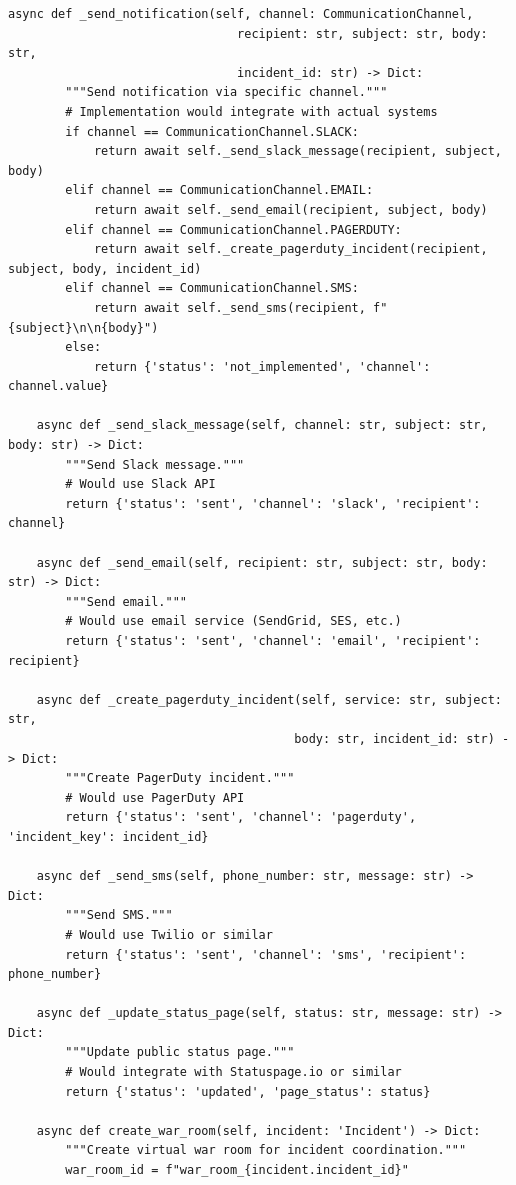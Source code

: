 \begin{lstlisting}[style=python, caption={Incident communication with multi-channel notifications}]
    async def _send_notification(self, channel: CommunicationChannel,
                                recipient: str, subject: str, body: str,
                                incident_id: str) -> Dict:
        """Send notification via specific channel."""
        # Implementation would integrate with actual systems
        if channel == CommunicationChannel.SLACK:
            return await self._send_slack_message(recipient, subject, body)
        elif channel == CommunicationChannel.EMAIL:
            return await self._send_email(recipient, subject, body)
        elif channel == CommunicationChannel.PAGERDUTY:
            return await self._create_pagerduty_incident(recipient, subject, body, incident_id)
        elif channel == CommunicationChannel.SMS:
            return await self._send_sms(recipient, f"{subject}\n\n{body}")
        else:
            return {'status': 'not_implemented', 'channel': channel.value}

    async def _send_slack_message(self, channel: str, subject: str, body: str) -> Dict:
        """Send Slack message."""
        # Would use Slack API
        return {'status': 'sent', 'channel': 'slack', 'recipient': channel}

    async def _send_email(self, recipient: str, subject: str, body: str) -> Dict:
        """Send email."""
        # Would use email service (SendGrid, SES, etc.)
        return {'status': 'sent', 'channel': 'email', 'recipient': recipient}

    async def _create_pagerduty_incident(self, service: str, subject: str,
                                        body: str, incident_id: str) -> Dict:
        """Create PagerDuty incident."""
        # Would use PagerDuty API
        return {'status': 'sent', 'channel': 'pagerduty', 'incident_key': incident_id}

    async def _send_sms(self, phone_number: str, message: str) -> Dict:
        """Send SMS."""
        # Would use Twilio or similar
        return {'status': 'sent', 'channel': 'sms', 'recipient': phone_number}

    async def _update_status_page(self, status: str, message: str) -> Dict:
        """Update public status page."""
        # Would integrate with Statuspage.io or similar
        return {'status': 'updated', 'page_status': status}

    async def create_war_room(self, incident: 'Incident') -> Dict:
        """Create virtual war room for incident coordination."""
        war_room_id = f"war_room_{incident.incident_id}"


\end{lstlisting}
